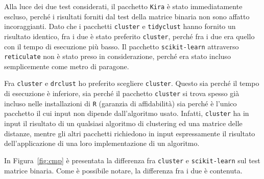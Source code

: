\documentclass[a4paper, 12pt]{report}
\begin{document}
			Alla luce dei due test considerati, il pacchetto \texttt{Kira}
			è stato immediatamente escluso, perché i risultati forniti dal
			test della matrice binaria non sono affatto incoraggianti.
			Dato che i pacchetti \texttt{cluster} e \texttt{tidyclust}
			hanno fornito un risultato identico, fra i due è stato preferito
			\texttt{cluster}, perché fra i due era quello con il tempo di
			esecuzione più basso. Il pacchetto \texttt{scikit-learn}
			attraverso \texttt{reticulate} non è stato preso in
			considerazione, perché era stato incluso semplicemente
			come metro di paragone.

			Fra \texttt{cluster} e \texttt{drclust} ho preferito scegliere
			\texttt{cluster}. Questo sia perché il tempo di esecuzione è
			inferiore, sia perché il pacchetto \texttt{cluster} si trova
			spesso già incluso nelle installazioni di \texttt{R} (garanzia
			di affidabilità) sia perché è l'unico pacchetto il cui input
			non dipende dall'algoritmo usato. Infatti, \texttt{cluster}
			ha in input il risultato di un qualsiasi algoritmo di clustering
			ed una matrice delle distanze, mentre gli altri pacchetti
			richiedono in input espressamente il risultato dell'applicazione
			di una loro implementazione di un algoritmo.

			In Figura~\ref{fig:cmp} è presentata la differenza fra
			\texttt{cluster} e \texttt{scikit-learn} sul test matrice
			binaria. Come è possibile notare, la differenza fra i due
			è contenuta.
\end{document}
